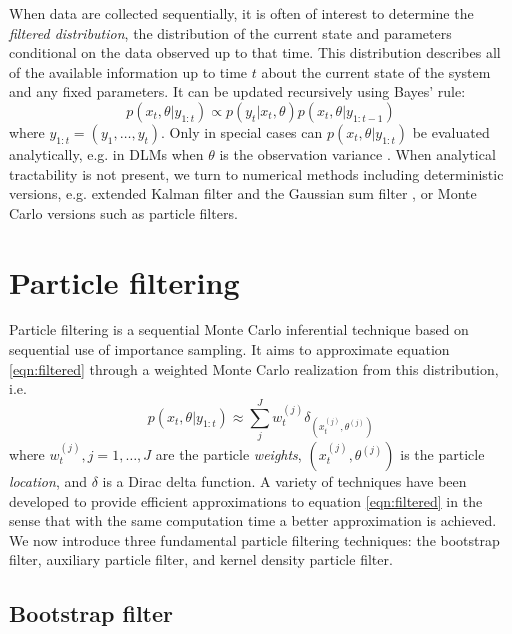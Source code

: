 \documentclass{elsarticle}
\begin{document}
When data are collected sequentially, it is often of interest to determine the \emph{filtered distribution}, the distribution of the current state and parameters conditional on the data observed up to that time. This distribution describes all of the available information up to time $t$ about the current state of the system and any fixed parameters. It can be updated recursively using Bayes' rule:
\begin{equation}
p(x_t,\theta| y_{1:t}) \propto p(y_t|x_t,\theta)p(x_t,\theta|y_{1:t-1}) \label{eqn:filtered}
\end{equation}
where $y_{1:t} = (y_1,\ldots,y_t)$. Only in special cases can $p(x_t,\theta| y_{1:t})$ be evaluated analytically, e.g. in DLMs when $\theta$ is the observation variance \cite[Sec 4.3,][]{petris2009dynamic}. When analytical tractability is not present, we turn to numerical methods including deterministic versions, e.g. extended Kalman filter and the Gaussian sum filter \citep{Alsp:Sore:nonl:1972}, or Monte Carlo versions such as particle filters.

\section{Particle filtering \label{sec:filtering}}

Particle filtering is a sequential Monte Carlo inferential technique based on sequential use of importance sampling. It aims to approximate equation \eqref{eqn:filtered} through a weighted Monte Carlo realization from this distribution, i.e.
\begin{equation}
p(x_t,\theta| y_{1:t}) \approx \sum_{j}^J w_t^{(j)} \delta_{(x_t^{(j)},\theta^{(j)})} \label{eqn:approx}
\end{equation}
where $w_t^{(j)},j=1,\ldots,J$ are the particle \emph{weights}, $(x_t^{(j)},\theta^{(j)})$ is the particle \emph{location}, and $\delta$ is a Dirac delta function. A variety of techniques have been developed to provide efficient approximations to equation \eqref{eqn:filtered} in the sense that with the same computation time a better approximation is achieved. We now introduce three fundamental particle filtering techniques: the bootstrap filter, auxiliary particle filter, and kernel density particle filter.

\subsection{Bootstrap filter \label{sec:bf}}
\end{document}
